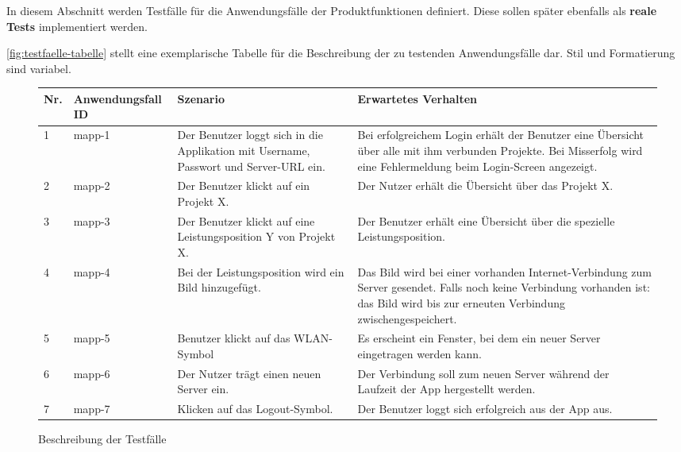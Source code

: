 \begin{tcolorbox}
In diesem Abschnitt werden Testfälle für die Anwendungsfälle der Produktfunktionen definiert.
Diese sollen später ebenfalls als \textbf{reale Tests} implementiert werden.

\autoref{fig:testfaelle-tabelle} stellt eine exemplarische Tabelle für die Beschreibung der zu testenden Anwendungsfälle dar. 
Stil und Formatierung sind variabel.
\end{tcolorbox}

\begin{figure}[!h]
	\begin{center}
		\begin{tabularx}{\textwidth}{ p{} | p{} | p{} | X }
			\textbf{Nr.} & \textbf{Anwendungsfall ID} & \textbf{Szenario} & \textbf{Erwartetes Verhalten} \\ \hline
			1 & mapp-1 & Der Benutzer loggt sich in die Applikation mit Username, Passwort und Server-URL ein. & Bei erfolgreichem Login erhält der Benutzer eine Übersicht über alle mit ihm verbunden Projekte. Bei Misserfolg wird eine Fehlermeldung beim Login-Screen angezeigt. \\ \hline
			2 & mapp-2 & Der Benutzer klickt auf ein Projekt X. & Der Nutzer erhält die Übersicht über das Projekt X. \\ \hline
			3 & mapp-3 & Der Benutzer klickt auf eine Leistungsposition Y von Projekt X. & Der Benutzer erhält eine Übersicht über die spezielle Leistungsposition. \\ \hline
			4 & mapp-4 & Bei der Leistungsposition wird ein Bild hinzugefügt. & Das Bild wird bei einer vorhanden Internet-Verbindung zum Server gesendet. Falls noch keine Verbindung vorhanden ist: das Bild wird bis zur erneuten Verbindung zwischengespeichert. \\ \hline
			5 & mapp-5 & Benutzer klickt auf das WLAN-Symbol & Es erscheint ein Fenster, bei dem ein neuer Server eingetragen werden kann. \\ \hline
			6 & mapp-6 & Der Nutzer trägt einen neuen Server ein. & Der Verbindung soll zum neuen Server während der Laufzeit der App hergestellt werden. \\ \hline
			7 & mapp-7 & Klicken auf das Logout-Symbol. & Der Benutzer loggt sich erfolgreich aus der App aus. \\ \hline
		\end{tabularx}	
	\end{center}
	\caption{Beschreibung der Testfälle}
	\label{fig:testfaelle-tabelle}
\end{figure}
